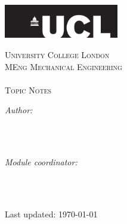 \begin{titlepage}

  \newcommand{\HRule}{\rule{\linewidth}{0.5mm}} %


  \center
  \includegraphics[width=5cm]{Title/UCL.png}\\[1cm] %

  \center %


  \textsc{\LARGE University College London }\\[1.5cm]
  \textsc{\Large MEng Mechanical Engineering  }\\[0.5cm]
  \textsc{\large \mymodulename }\\[1.5cm]

  \makeatletter
  { \huge \textsc{Topic Notes}}\\[1.5cm] %


  \begin{minipage}{0.4\textwidth}
    \begin{flushleft} \large
      \emph{Author:}\\
      \myauthor
      \\[1.2em]
    \end{flushleft}
  \end{minipage}
  ~
  \begin{minipage}{0.4\textwidth}
    \begin{flushright} \large
      \emph{Module coordinator:} \\
      \myprof \\[1.2em]
    \end{flushright}
  \end{minipage}\\[2cm]
  \makeatother


  {\large Last updated: \today}\\[2cm]
  \vfill %

\end{titlepage}